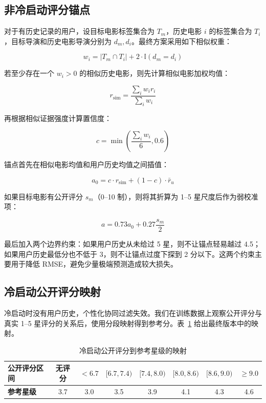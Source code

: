 \documentclass[UTF8,a4paper,10pt,fontset=none]{ctexart}
\begin{document}
\subsection{非冷启动评分锚点}

对于有历史记录的用户，设目标电影标签集合为 $T_m$，历史电影 $i$ 的标签集合为 $T_i$，目标导演和历史电影导演分别为 $d_m,d_i$。最终方案采用如下相似权重：

\[
w_i = |T_m \cap T_i| + 2 \cdot \mathbb{I}(d_m = d_i)
\]

若至少存在一个 $w_i>0$ 的相似历史电影，则先计算相似电影加权均值：

\[
r_{\mathrm{sim}} = \frac{\sum_i w_i r_i}{\sum_i w_i}
\]

再根据相似证据强度计算置信度：

\[
c = \min\left(\frac{\sum_i w_i}{6}, 0.6\right)
\]

锚点首先在相似电影均值和用户历史均值之间插值：

\[
a_0 = c \cdot r_{\mathrm{sim}} + (1-c) \cdot \bar r_u
\]

如果目标电影有公开评分 $s_m$（0--10 制），则将其折算为 1--5 星尺度后作为弱校准项：

\[
a = 0.73a_0 + 0.27\frac{s_m}{2}
\]

最后加入两个边界约束：如果用户历史从未给过 5 星，则不让锚点轻易越过 4.5；如果用户历史最低分也不低于 3，则不让锚点过度下探到 2 分以下。这两个约束主要用于降低 RMSE，避免少量极端预测造成较大损失。

\subsection{冷启动公开评分映射}

冷启动时没有用户历史，个性化协同过滤失效。我们在训练数据上观察公开评分与真实 1--5 星评分的关系后，使用分段映射得到参考分。表~\ref{tab:cold_map} 给出最终版本中的映射。

\begin{table}[htbp]
    \centering
    \setlength{\tabcolsep}{10pt}
    \caption{冷启动公开评分到参考星级的映射}
    \label{tab:cold_map}
    \small
    \begin{tabular}{@{}lccccccc@{}}
        \toprule
        \textbf{公开评分区间} & 无评分 & $<6.7$ & $[6.7,7.4)$ & $[7.4,8.0)$ & $[8.0,8.6)$ & $[8.6,9.0)$ & $\ge 9.0$ \\
        \midrule
        \textbf{参考星级} & 3.7 & 3.0 & 3.5 & 3.9 & 4.1 & 4.3 & 4.6 \\
        \bottomrule
    \end{tabular}
\end{table}
\end{document}
